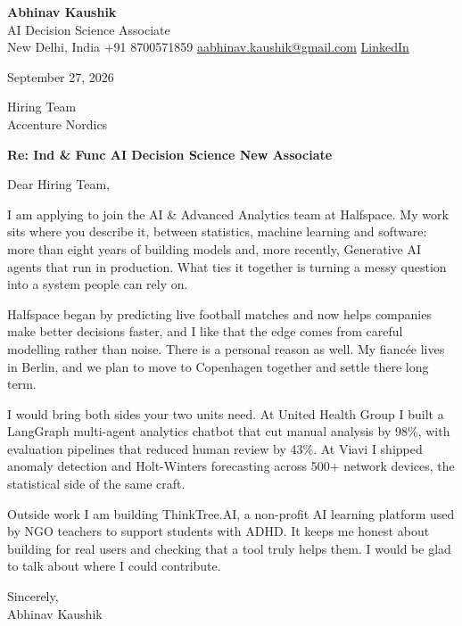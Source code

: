 \documentclass[11pt,a4paper]{article}
\begin{document}
{\Large\bfseries Abhinav Kaushik}\\
AI Decision Science Associate\\
New Delhi, India \textbar{} +91 8700571859 \textbar{} \href{mailto:aabhinav.kaushik@gmail.com}{aabhinav.kaushik@gmail.com} \textbar{} \href{https://www.linkedin.com/in/abhinav-kaushik10/}{LinkedIn}  

September 27, 2026

Hiring Team\\
Accenture Nordics

\textbf{Re: Ind \& Func AI Decision Science New Associate}

Dear Hiring Team,

I am applying to join the AI \& Advanced Analytics team at Halfspace. My work sits where you describe it, between statistics, machine learning and software: more than eight years of building models and, more recently, Generative AI agents that run in production. What ties it together is turning a messy question into a system people can rely on.

Halfspace began by predicting live football matches and now helps companies make better decisions faster, and I like that the edge comes from careful modelling rather than noise. There is a personal reason as well. My fiancée lives in Berlin, and we plan to move to Copenhagen together and settle there long term.

I would bring both sides your two units need. At United Health Group I built a LangGraph multi-agent analytics chatbot that cut manual analysis by 98\%, with evaluation pipelines that reduced human review by 43\%. At Viavi I shipped anomaly detection and Holt-Winters forecasting across 500+ network devices, the statistical side of the same craft.

Outside work I am building ThinkTree.AI, a non-profit AI learning platform used by NGO teachers to support students with ADHD. It keeps me honest about building for real users and checking that a tool truly helps them. I would be glad to talk about where I could contribute.

Sincerely,\\[4pt]
Abhinav Kaushik
\end{document}
